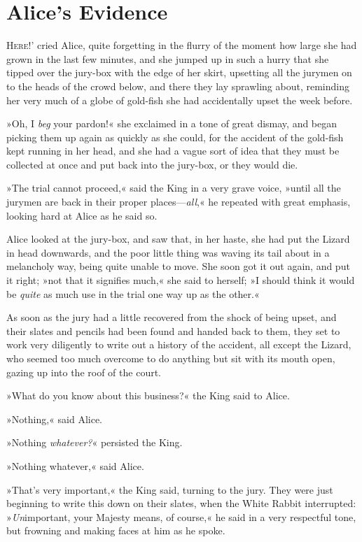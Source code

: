 \chapter{Alice's Evidence}
	
\lettrine[lines=4,findent=2pt,ante=`]{H}{ere!}' cried Alice, quite forgetting in the flurry of the moment how large she had grown in the last few minutes, and she jumped up in such a hurry that she tipped over the jury-box with the edge of her skirt, upsetting all the jurymen on to the heads of the crowd below, and there they lay sprawling about, reminding her very much of a globe of gold-fish she had accidentally upset the week before.

»Oh, I \textit{beg} your pardon!« she exclaimed in a tone of great dismay, and began picking them up again as quickly as she could, for the accident of the gold-fish kept running in her head, and she had a vague sort of idea that they must be collected at once and put back into the jury-box, or they would die.

»The trial cannot proceed,« said the King in a very grave voice, »until all the jurymen are back in their proper places—\textit{all},« he repeated with great emphasis, looking hard at Alice as he said so.

Alice looked at the jury-box, and saw that, in her haste, she had put the Lizard in head downwards, and the poor little thing was waving its tail about in a melancholy way, being quite unable to move. She soon got it out again, and put it right; »not that it signifies much,« she said to herself; »I should think it would be \textit{quite} as much use in the trial one way up as the other.«

As soon as the jury had a little recovered from the shock of being upset, and their slates and pencils had been found and handed back to them, they set to work very diligently to write out a history of the accident, all except the Lizard, who seemed too much overcome to do anything but sit with its mouth open, gazing up into the roof of the court.

»What do you know about this business?« the King said to Alice.

»Nothing,« said Alice.

»Nothing \textit{whatever?}« persisted the King.

»Nothing whatever,« said Alice.

»That's very important,« the King said, turning to the jury. They were just beginning to write this down on their slates, when the White Rabbit interrupted: »\textit{Un}important, your Majesty means, of course,« he said in a very respectful tone, but frowning and making faces at him as he spoke.

